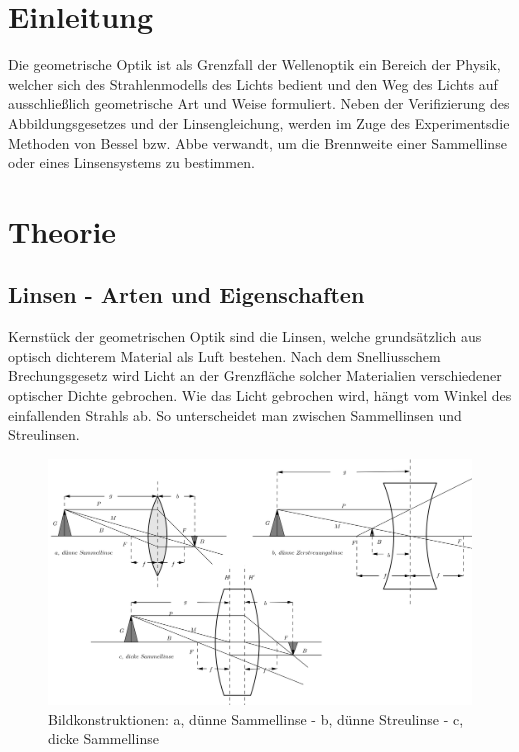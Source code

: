 
\section{Einleitung}
\setcounter{page}{1}
Die geometrische Optik ist als Grenzfall der Wellenoptik ein Bereich der Physik, welcher sich des Strahlenmodells des Lichts bedient und
den Weg des Lichts auf ausschließlich geometrische Art und Weise formuliert. Neben der Verifizierung des Abbildungsgesetzes und der 
Linsengleichung, werden im Zuge des Experimentsdie Methoden von Bessel bzw. Abbe verwandt, um die Brennweite einer Sammellinse oder 
eines Linsensystems zu bestimmen.

\section{Theorie}
\subsection{Linsen - Arten und Eigenschaften}
Kernstück der geometrischen Optik sind die Linsen, welche grundsätzlich aus optisch dichterem Material als Luft bestehen. Nach dem 
Snelliusschem Brechungsgesetz wird Licht an der Grenzfläche solcher Materialien verschiedener optischer Dichte gebrochen. Wie das Licht
gebrochen wird, hängt vom Winkel des einfallenden Strahls ab. So unterscheidet man zwischen Sammellinsen und Streulinsen. 

\begin{figure}[H]
 \includegraphics[width=\textwidth]{pics/408a.png}
 \centering
 \caption{Bildkonstruktionen: a, dünne Sammellinse - b, dünne Streulinse - c, dicke Sammellinse}
 \label{linsen}
\end{figure}

